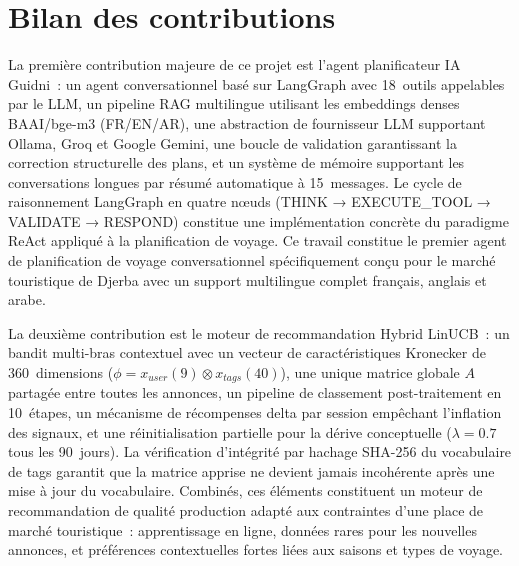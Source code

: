 
\section*{Bilan des contributions}

La première contribution majeure de ce projet est l'agent planificateur IA Guidni~: un agent
conversationnel basé sur LangGraph avec 18~outils appelables par le LLM, un pipeline RAG
multilingue utilisant les embeddings denses BAAI/bge-m3 (FR/EN/AR), une abstraction de
fournisseur LLM supportant Ollama, Groq et Google Gemini, une boucle de validation garantissant
la correction structurelle des plans, et un système de mémoire supportant les conversations
longues par résumé automatique à 15~messages. Le cycle de raisonnement LangGraph en quatre
nœuds (THINK → EXECUTE\_TOOL → VALIDATE → RESPOND) constitue une implémentation concrète du
paradigme ReAct appliqué à la planification de voyage. Ce travail constitue le premier agent
de planification de voyage conversationnel spécifiquement conçu pour le marché touristique de
Djerba avec un support multilingue complet français, anglais et arabe.

La deuxième contribution est le moteur de recommandation Hybrid LinUCB~: un bandit
multi-bras contextuel avec un vecteur de caractéristiques Kronecker de 360~dimensions
($\phi = x_{user}(9) \otimes x_{tags}(40)$), une unique matrice globale $A$ partagée entre
toutes les annonces, un pipeline de classement post-traitement en 10~étapes, un mécanisme
de récompenses delta par session empêchant l'inflation des signaux, et une réinitialisation
partielle pour la dérive conceptuelle ($\lambda = 0.7$ tous les 90~jours). La vérification
d'intégrité par hachage SHA-256 du vocabulaire de tags garantit que la matrice apprise ne
devient jamais incohérente après une mise à jour du vocabulaire. Combinés, ces éléments
constituent un moteur de recommandation de qualité production adapté aux contraintes d'une
place de marché touristique~: apprentissage en ligne, données rares pour les nouvelles
annonces, et préférences contextuelles fortes liées aux saisons et types de voyage.


